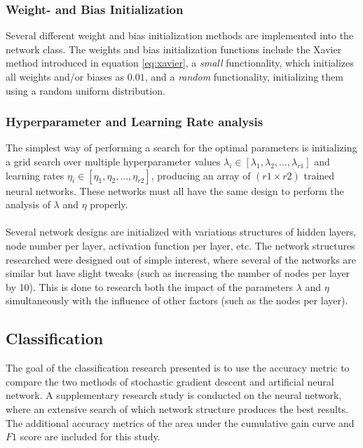         \subsubsection{Weight- and Bias Initialization}
            Several different weight and bias initialization methods are implemented into the network class. The weights and bias initialization functions include the Xavier method introduced in equation \ref{eq:xavier}, a \textit{small} functionality, which initializes all weights and/or biases as $0.01$, and a \textit{random} functionality, initializing them using a random uniform distribution.
            
        \subsubsection{Hyperparameter and Learning Rate analysis}
            The simplest way of performing a search for the optimal parameters is initializing a grid search over multiple hyperparameter values $\lambda_i \in [\lambda_1, \lambda_2, \hdots, \lambda_{r1}]$ and learning rates $\eta_i \in [\eta_1, \eta_2, \hdots, \eta_{r2}]$, producing an array of $(r1 \times r2)$ trained neural networks. These networks must all have the same design to perform the analysis of $\lambda$ and $\eta$ properly.\\\\
            Several network designs are initialized with variations structures of hidden layers, node number per layer, activation function per layer, etc. The network structures researched were designed out of simple interest, where several of the networks are similar but have slight tweaks (such as increasing the number of nodes per layer by 10). This is done to research both the impact of the parameters $\lambda$ and $\eta$ simultaneously with the influence of other factors (such as the nodes per layer).
          
    \subsection{Classification}
        The goal of the classification research presented is to use the accuracy metric to compare the two methods of stochastic gradient descent and artificial neural network. A supplementary research study is conducted on the neural network, where an extensive search of which network structure produces the best results. The additional accuracy metrics of the area under the cumulative gain curve and $F1$ score are included for this study.
